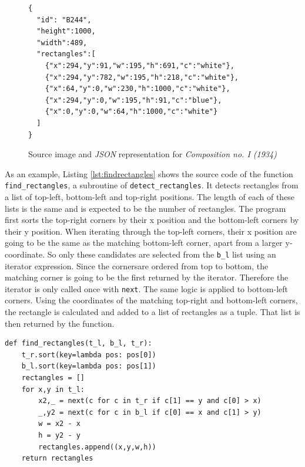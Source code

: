 \documentclass[serif,article,noparskip]{agse-thesis}
\begin{document}
\begin{figure}[b]
\begin{minipage}{0.8\textwidth}
\begin{lstlisting}
{
  "id": "B244",
  "height":1000,
  "width":489,
  "rectangles":[
    {"x":294,"y":91,"w":195,"h":691,"c":"white"},
    {"x":294,"y":782,"w":195,"h":218,"c":"white"},
    {"x":64,"y":0,"w":230,"h":1000,"c":"white"},
    {"x":294,"y":0,"w":195,"h":91,"c":"blue"},
    {"x":0,"y":0,"w":64,"h":1000,"c":"white"}
  ]
}
\end{lstlisting}
\end{minipage}
\caption{Source image and \textit{JSON} representation for \textit{Composition no. I (1934)}}
\label{fig:json}
\end{figure}

As an example, Listing \ref{lst:findrectangles} shows the source code of the
function \texttt{find\_rectangles}, a subroutine of \texttt{detect\_rectangles}.
It detects rectangles from a list of top-left, bottom-left and top-right
positions. The length of each of these lists is the same and is expected to be
the number of rectangles. The program first sorts the top-right corners by their
x position and the bottom-left corners by their y position. When iterating
through the top-left corners, their x position are going to be the same as the
matching bottom-left corner, apart from a larger y-coordinate. So only these
candidates are selected from the \texttt{b\_l} list using an iterator
expression. Since the cornersare ordered from top to bottom, the matching corner
is going to be the first returned by the iterator. Therefore the iterator is
only called once with \texttt{next}. The same logic is applied to bottom-left
corners. Using the coordinates of the matching top-right and bottom-left
corners, the rectangle is calculated and added to a list of rectangles as a
tuple. That list is then returned by the function.

\begin{minipage}{\linewidth}
\begin{lstlisting}[otherkeywords=def,label=lst:findrectangles,caption=Function for constructing rectangles from corners]
def find_rectangles(t_l, b_l, t_r):
    t_r.sort(key=lambda pos: pos[0])
    b_l.sort(key=lambda pos: pos[1])
    rectangles = []
    for x,y in t_l:
        x2,_ = next(c for c in t_r if c[1] == y and c[0] > x)
        _,y2 = next(c for c in b_l if c[0] == x and c[1] > y)
        w = x2 - x
        h = y2 - y
        rectangles.append((x,y,w,h))
    return rectangles
\end{lstlisting}
\end{minipage}
\end{document}
